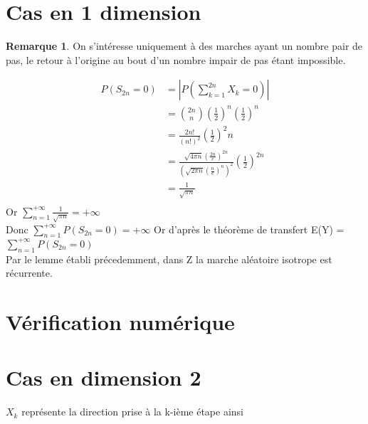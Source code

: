 \documentclass{article}
\theoremstyle{definition}
\newtheorem{remarque}{Remarque}
\begin{document}
\section{Cas en 1 dimension}
\begin{remarque}
On s'intéresse uniquement à des marches ayant un nombre pair de pas, le retour à l'origine au bout d'un nombre impair de pas étant impossible.
\end{remarque}

\begin{align*}
P(S_{2n} = 0) &= |P( \sum_{k=1}^{2n} X_k = 0 )| \\
 &= \binom{2n}{n} (\frac{1}{2})^n (\frac{1}{2})^n \\
 &= \frac{2n!}{(n!)^2} (\frac{1}{2})^2n \\
 &= \frac{\sqrt{4 \pi n} (\frac{2n}{e})^{2n}}{(\sqrt{2 \pi n} (\frac{n}{e})^n)^{2}} (\frac{1}{2})^{2n}\\
 &= \frac{1}{\sqrt{\pi n}}\\
\end{align*}
Or $\sum_{n=1}^{+\infty} \frac{1}{\sqrt{\pi n}} = +\infty$ \\
Donc $\sum_{n=1}^{+\infty} P(S_{2n} = 0) = +\infty$
Or d'après le théorème de transfert E(Y) = $\sum_{n=1}^{+\infty} P(S_{2n} = 0)$ \\
Par le lemme établi précedemment, dans Z la marche aléatoire isotrope est récurrente.

\section{Vérification numérique}

\section{Cas en dimension 2}


$X_{k}$  représente la direction prise à la k-ième étape ainsi
\end{document}
